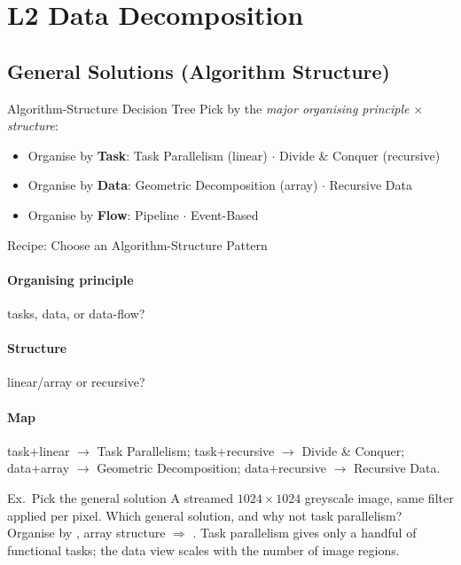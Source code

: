 \section{L2 Data Decomposition}

\subsection{General Solutions (Algorithm Structure)}

\begin{concept}{Algorithm-Structure Decision Tree}
    Pick by the \emph{major organising principle} $\times$ \emph{structure}:
    \begin{itemize}
        \item Organise by \textbf{Task}: Task Parallelism (linear) $\cdot$ Divide \& Conquer (recursive)
        \item Organise by \textbf{Data}: Geometric Decomposition (array) $\cdot$ Recursive Data
        \item Organise by \textbf{Flow}: Pipeline $\cdot$ Event-Based
    \end{itemize}
\end{concept}


\begin{KR}{Recipe: Choose an Algorithm-Structure Pattern}
    \paragraph{Organising principle} tasks, data, or data-flow?
    \paragraph{Structure} linear/array or recursive?
    \paragraph{Map} task+linear $\to$ Task Parallelism; task+recursive $\to$ Divide \& Conquer; data+array $\to$ Geometric Decomposition; data+recursive $\to$ Recursive Data.
\end{KR}

\begin{example2}{Ex.\ Pick the general solution}
    A streamed $1024\times1024$ greyscale image, same filter applied per pixel. Which general solution, and why not task parallelism?
     \\ 
    Organise by , array structure $\Rightarrow$ . Task parallelism gives only a handful of functional tasks; the data view scales with the number of image regions.
\end{example2}

